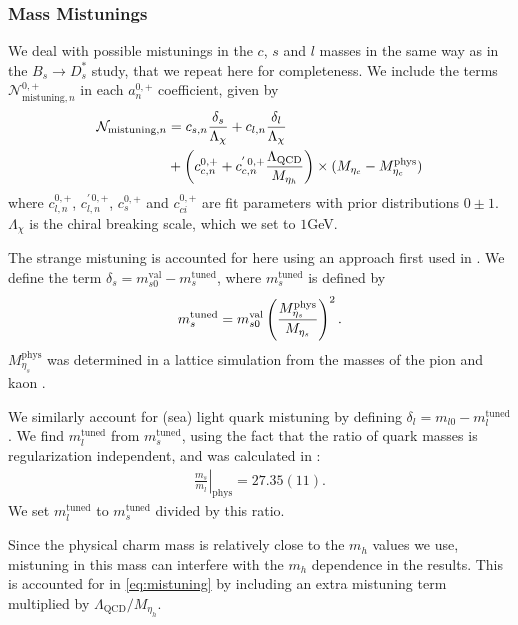 \subsubsection{Mass Mistunings}

We deal with possible mistunings in the $c$, $s$ and $l$ masses in the same way as in the $B_s\to D_s^*$ study, that we repeat here for completeness. We include the terms $\mathcal{N}_{\text{mistuning},n}^{0,+}$ in each $a^{0,+}_n$ coefficient, given by
\begin{align}
  \mathcal{N}_{\text{mistuning},n} &= c_{s,n} {\delta_s\over \Lambda_{\chi}} + c_{l,n} {\delta_l\over \Lambda_{\chi}}
    \label{eq:mistuning}
  \\ &+\left(c_{c,n}^{0,+} + c_{c,n}^{'\,0,+}{\Lambda_{\text{QCD}}\over M_{\eta_h}}\right) \times (M_{\eta_c} - M_{\eta_c}^{\text{phys}})
  \nonumber
\end{align}
where $c^{0,+}_{l,n}$, $c^{'\,0,+}_{l,n}$, $c^{0,+}_s$ and $c^{0,+}_{ci}$ are fit parameters with prior distributions $0\pm 1$. $\Lambda_{\chi}$ is the chiral breaking scale, which we set to $1$GeV.

The strange mistuning is accounted for here using an approach first used in \cite{Chakraborty:2014aca}. We define the term $\delta_s = m^{\text{val}}_{s0} - m_s^{\text{tuned}}$, where $m_s^{\text{tuned}}$ is defined by
\begin{align}
  m_s^{\text{tuned}} = m^{\text{val}}_{s0} \left({ M^{\text{phys}}_{\eta_s} \over M_{\eta_s} }\right)^2.
\end{align}
$M_{\eta_s}^{\text{phys}}$ was determined in a lattice simulation from the masses of the pion and kaon \cite{Dowdall:2013rya}.

We similarly account for (sea) light quark mistuning by defining $\delta_l = m_{l0} - m_l^{\text{tuned}}$. We find $m_l^{\text{tuned}}$ from $m_s^{\text{tuned}}$, using the fact that the ratio of quark masses is regularization independent, and was calculated in \cite{Bazavov:2014wgs}:
\begin{align}
  \left.\frac{m_s}{m_l}\right\rvert_{\textrm{phys}} = 27.35(11).
\end{align}
We set $m_l^{\text{tuned}}$ to $m_s^{\text{tuned}}$ divided by this ratio.

Since the physical charm mass is relatively close to the $m_h$ values we use, mistuning in this mass can interfere with the $m_h$ dependence in the results. This is accounted for in \eqref{eq:mistuning} by including an extra mistuning term multiplied by $\Lambda_{\text{QCD}}/ M_{\eta_h}$.

